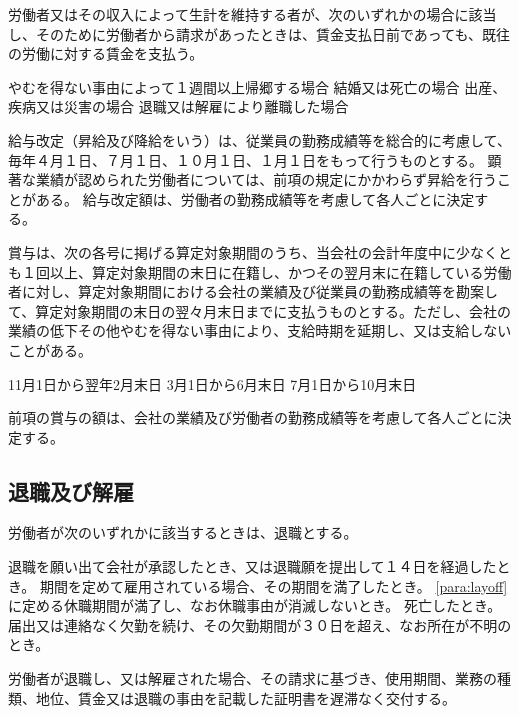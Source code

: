 \documentclass[10pt,a4paper,uplatex]{jsarticle}
\begin{document}
労働者又はその収入によって生計を維持する者が、次のいずれかの場合に該当し、そのために労働者から請求があったときは、賃金支払日前であっても、既往の労働に対する賃金を支払う。
\begin{enumerate}
    \itm やむを得ない事由によって１週間以上帰郷する場合
    \itm 結婚又は死亡の場合
    \itm 出産、疾病又は災害の場合
    \itm 退職又は解雇により離職した場合
\end{enumerate}

給与改定（昇給及び降給をいう）は、従業員の勤務成績等を総合的に考慮して、毎年４月１日、７月１日、１０月１日、１月１日をもって行うものとする。
\term
顕著な業績が認められた労働者については、前項の規定にかかわらず昇給を行うことがある。
\term
給与改定額は、労働者の勤務成績等を考慮して各人ごとに決定する。

賞与は、次の各号に掲げる算定対象期間のうち、当会社の会計年度中に少なくとも１回以上、算定対象期間の末日に在籍し、かつその翌月末に在籍している労働者に対し、算定対象期間における会社の業績及び従業員の勤務成績等を勘案して、算定対象期間の末日の翌々月末日までに支払うものとする。ただし、会社の業績の低下その他やむを得ない事由により、支給時期を延期し、又は支給しないことがある。
\begin{enumerate}
    \itm 11月1日から翌年2月末日
    \itm 3月1日から6月末日
    \itm 7月1日から10月末日 
\end{enumerate}
\term
前項の賞与の額は、会社の業績及び労働者の勤務成績等を考慮して各人ごとに決定する。


\subsection{退職及び解雇}

労働者が次のいずれかに該当するときは、退職とする。
\begin{enumerate}
    \itm 退職を願い出て会社が承認したとき、又は退職願を提出して１４日を経過したとき。
    \itm 期間を定めて雇用されている場合、その期間を満了したとき。
    \itm \ref{para:layoff}に定める休職期間が満了し、なお休職事由が消滅しないとき。
    \itm 死亡したとき。
    \itm 届出又は連絡なく欠勤を続け、その欠勤期間が３０日を超え、なお所在が不明のとき。
\end{enumerate}
\term
労働者が退職し、又は解雇された場合、その請求に基づき、使用期間、業務の種類、地位、賃金又は退職の事由を記載した証明書を遅滞なく交付する。
\end{document}
